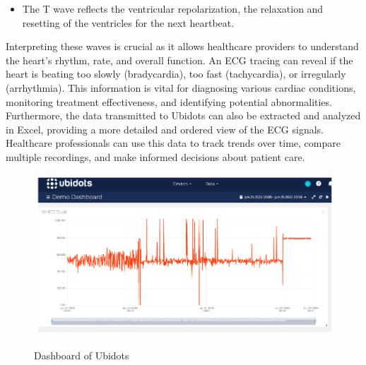 \begin{itemize}
    \item The T wave reflects the ventricular repolarization, the relaxation and resetting of the ventricles for the next heartbeat.
\end{itemize}
Interpreting these waves is crucial as it allows healthcare providers to understand the heart's rhythm, rate, and overall function. An ECG tracing can reveal if the heart is beating too slowly (bradycardia), too fast (tachycardia), or irregularly (arrhythmia). This information is vital for diagnosing various cardiac conditions, monitoring treatment effectiveness, and identifying potential abnormalities.
Furthermore, the data transmitted to Ubidots can also be extracted and analyzed in Excel, providing a more detailed and ordered view of the ECG signals. Healthcare professionals can use this data to track trends over time, compare multiple recordings, and make informed decisions about patient care.
 \begin{figure}[htbp]
    \centering
     \includegraphics[width=0.9\linewidth]{C_chap/fig12.png}
\\\caption{Dashboard of Ubidots}
 \end{figure}
\pagebreak
